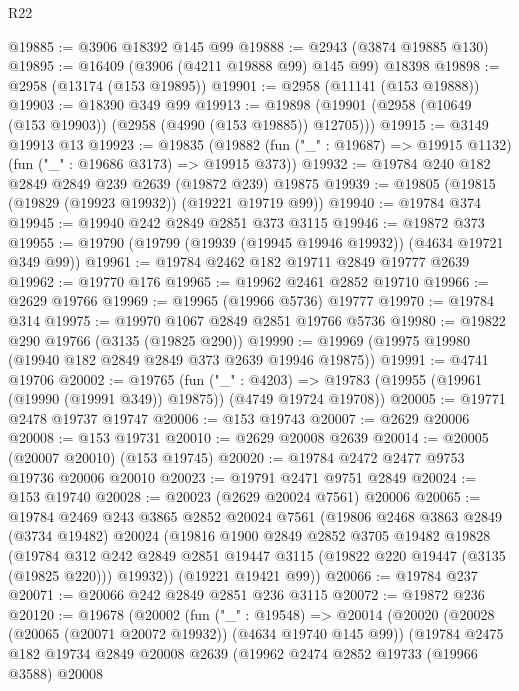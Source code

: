 \begin{lexlean}{R22}
\begin{coremodule}
@19885 := @3906 @18392 @145 @99
@19888 := @2943 (@3874 @19885 @130)
@19895 := @16409 (@3906 (@4211 @19888 @99) @145 @99) @18398
@19898 := @2958 (@13174 (@153 @19895))
@19901 := @2958 (@11141 (@153 @19888))
@19903 := @18390 @349 @99
@19913 := @19898 (@19901 (@2958 (@10649 (@153 @19903)) (@2958 (@4990 (@153 @19885)) @12705)))
@19915 := @3149 @19913 @13
@19923 := @19835
    (@19882 (fun ("_" : @19687) => @19915 @1132) (fun ("_" : @19686 @3173) => @19915 @373))
@19932 := @19784 @240 @182 @2849 @2849 @239 @2639 (@19872 @239) @19875
@19939 := @19805 (@19815 (@19829 (@19923 @19932)) (@19221 @19719 @99))
@19940 := @19784 @374
@19945 := @19940 @242 @2849 @2851 @373 @3115
@19946 := @19872 @373
@19955 := @19790 (@19799 (@19939 (@19945 @19946 @19932)) (@4634 @19721 @349 @99))
@19961 := @19784 @2462 @182 @19711 @2849 @19777 @2639
@19962 := @19770 @176
@19965 := @19962 @2461 @2852 @19710
@19966 := @2629 @19766
@19969 := @19965 (@19966 @5736) @19777
@19970 := @19784 @314
@19975 := @19970 @1067 @2849 @2851 @19766 @5736
@19980 := @19822 @290 @19766 (@3135 (@19825 @290))
@19990 := @19969 (@19975 @19980 (@19940 @182 @2849 @2849 @373 @2639 @19946 @19875))
@19991 := @4741 @19706
@20002 := @19765
    (fun ("_" : @4203) =>
    @19783 (@19955 (@19961 (@19990 (@19991 @349)) @19875)) (@4749 @19724 @19708))
@20005 := @19771 @2478 @19737 @19747
@20006 := @153 @19743
@20007 := @2629 @20006
@20008 := @153 @19731
@20010 := @2629 @20008 @2639
@20014 := @20005 (@20007 @20010) (@153 @19745)
@20020 := @19784 @2472 @2477 @9753 @19736 @20006 @20010
@20023 := @19791 @2471 @9751 @2849
@20024 := @153 @19740
@20028 := @20023 (@2629 @20024 @7561) @20006
@20065 := @19784
    @2469
    @243
    @3865
    @2852
    @20024
    @7561
    (@19806
      @2468
      @3863
      @2849
      (@3734 @19482)
      @20024
      (@19816
        @1900
        @2849
        @2852
        @3705
        @19482
        @19828
        (@19784
          @312
          @242
          @2849
          @2851
          @19447
          @3115
          (@19822 @220 @19447 (@3135 (@19825 @220)))
          @19932))
      (@19221 @19421 @99))
@20066 := @19784 @237
@20071 := @20066 @242 @2849 @2851 @236 @3115
@20072 := @19872 @236
@20120 := @19678
    (@20002
      (fun ("_" : @19548) =>
      @20014
        (@20020
          (@20028 (@20065 (@20071 @20072 @19932)) (@4634 @19740 @145 @99))
          (@19784
            @2475
            @182
            @19734
            @2849
            @20008
            @2639
            (@19962
              @2474
              @2852
              @19733
              (@19966 @3588)
              @20008

\end{coremodule}
\end{lexlean}
